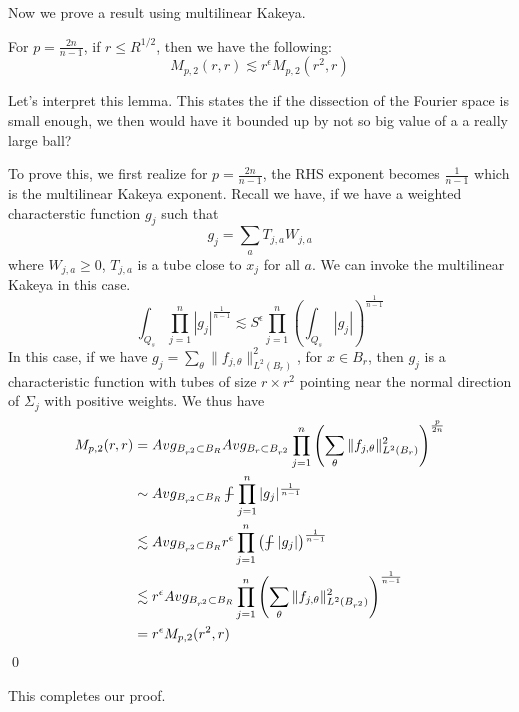 Now we prove a result using multilinear Kakeya.
\begin{lemma}[MK]
    For $p=\frac{2n}{n-1}$, if $r\leq R^{1/2}$, then we have the following:
    \begin{equation*}
        M_{p,2}(r,r)\lesssim r^\epsilon M_{p,2}(r^2, r)
    \end{equation*}
\end{lemma}
\begin{remark}
    Let's interpret this lemma. This states the if the dissection of the Fourier space is small enough, we then would have it bounded up by not so big value of a a really large ball?
\end{remark}
To prove this, we first realize for $p=\frac{2n}{n-1}$, the RHS exponent becomes $\frac{1}{n-1}$ which is the multilinear Kakeya exponent. Recall we have, if we have a weighted characterstic function $g_j$ such that
\begin{equation*}
    g_j=\sum_aT_{j,a}W_{j,a}
\end{equation*}
where $W_{j,a}\geq 0$, $T_{j,a}$ is a tube close to $x_j$ for all $a$.
We can invoke the multilinear Kakeya in this case.
\begin{equation*}
    \int_{Q_s}\prod_{j=1}^n|g_j|^{\frac{1}{n-1}}\lesssim S^\epsilon\prod_{j=1}^n\left(\int_{Q_s}|g_j| \right)^{\frac{1}{n-1}}
\end{equation*}
In this case, if we have $g_j=\sum_\theta\|f_{j,\theta}\|_{L^2(B_r)}^2$, for $x\in B_r$, then $g_j$ is a characteristic function with tubes of size $r\times r^2$ pointing near the normal direction of $\Sigma_j$ with positive weights.
We thus have
\begin{align*}
    M_{p,2}(r,r)&=Avg_{B_{r^2}\subset B_R}Avg_{B_r\subset B_{r^2}}\prod_{j=1}^n\left(\sum_\theta\|f_{j,\theta}\|_{L^2(B_r)}^2 \right)^{\frac{p}{2n}}\\
    &\sim Avg_{B_{r^2}\subset B_R}\avint\prod_{j=1}^n|g_j|^{\frac{1}{n-1}}\\
    &\lesssim Avg_{B_{r^2}\subset B_R}r^\epsilon\prod_{j=1}^n\left(\avint|g_j| \right)^{\frac{1}{n-1}}\\
    &\lesssim r^\epsilon Avg_{B_{r^2}\subset B_R}\prod_{j=1}^n\left(\sum_{\theta}\|f_{j,\theta}\|_{L^2(B_{r^2})}^2 \right)^{\frac{1}{n-1}}\\
    &=r^\epsilon M_{p,2}(r^2, r)
\end{align*}
\qed

This completes our proof.

